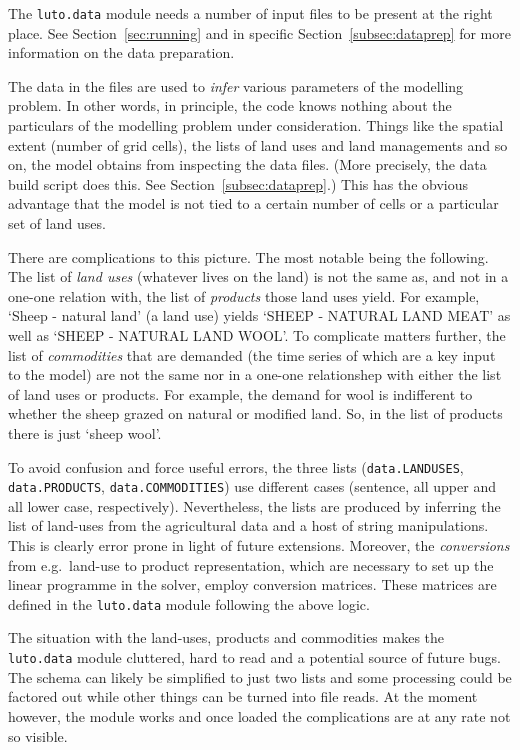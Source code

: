 \documentclass[12pt,a4paper,twoside]{article}
\begin{document}
The \texttt{luto.data} module needs a number of input files to be present at the right place. See Section~\ref{sec:running} and in specific Section~\ref{subsec:dataprep} for more information on the data preparation.

The data in the files are used to \emph{infer} various parameters of the modelling problem. In other words, in principle, the code knows nothing about the particulars of the modelling problem under consideration. Things like the spatial extent (number of grid cells), the lists of land uses and land managements and so on, the model obtains from inspecting the data files. (More precisely, the data build script does this. See Section~\ref{subsec:dataprep}.) This has the obvious advantage that the model is not tied to a certain number of cells or a particular set of land uses.

There are complications to this picture. The most notable being the following. The list of \emph{land uses} (whatever lives on the land) is not the same as, and not in a one-one relation with, the list of \emph{products} those land uses yield. For example, `Sheep - natural land' (a land use) yields `SHEEP - NATURAL LAND MEAT' as well as `SHEEP - NATURAL LAND WOOL'. To complicate matters further, the list of \emph{commodities} that are demanded (the time series of which are a key input to the model) are not the same nor in a one-one relationshep with either the list of land uses or products. For example, the demand for wool is indifferent to whether the sheep grazed on natural or modified land. So, in the list of products there is just `sheep wool'.

To avoid confusion and force useful errors, the three lists (\texttt{data.LANDUSES}, \texttt{data.PRODUCTS}, \texttt{data.COMMODITIES}) use different cases (sentence, all upper and all lower case, respectively). Nevertheless, the lists are produced by inferring the list of land-uses from the agricultural data and a host of string manipulations. This is clearly error prone in light of future extensions. Moreover, the \emph{conversions} from e.g.\ land-use to product representation, which are necessary to set up the linear programme in the solver, employ conversion matrices. These matrices are defined in the \texttt{luto.data} module following the above logic.

The situation with the land-uses, products and commodities makes the \texttt{luto.data} module cluttered, hard to read and a potential source of future bugs. The schema can likely be simplified to just two lists and some processing could be factored out while other things can be turned into file reads. At the moment however, the module works and once loaded the complications are at any rate not so visible.
\end{document}
